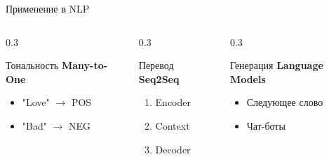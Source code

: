 \documentclass[aspectratio=169, 10pt]{beamer}
\begin{document}
\begin{frame}{Применение в NLP}
  \begin{columns}[T]
    \begin{column}{0.3\textwidth}
      \begin{block}{Тональность}
        \scriptsize
        \textbf{Many-to-One}
        \begin{itemize}
          \item "Love" $\to$ POS
          \item "Bad" $\to$ NEG
        \end{itemize}
      \end{block}
    \end{column}
    
    \begin{column}{0.3\textwidth}
      \begin{block}{Перевод}
        \scriptsize
        \textbf{Seq2Seq}
        \begin{enumerate}
          \item Encoder
          \item Context
          \item Decoder
        \end{enumerate}
      \end{block}
    \end{column}
    
    \begin{column}{0.3\textwidth}
      \begin{block}{Генерация}
        \scriptsize
        \textbf{Language Models}
        \begin{itemize}
          \item Следующее слово
          \item Чат-боты
        \end{itemize}
      \end{block}
    \end{column}
  \end{columns}
\end{frame}
\end{document}
